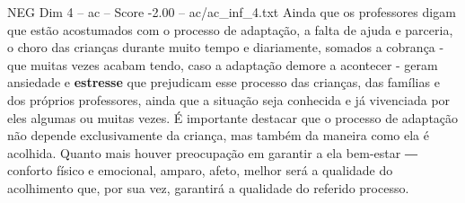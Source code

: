 \begin{textsample}{NEG Dim 4 – ac – Score -2.00 – ac/ac\_inf\_4.txt}
Ainda que os professores digam que estão acostumados com o processo de adaptação, a falta de ajuda e parceria, o choro das crianças durante muito tempo e diariamente, somados a cobrança - que muitas vezes acabam tendo, caso a adaptação demore a acontecer - geram ansiedade e \textbf{estresse} que prejudicam esse processo das crianças, das famílias e dos próprios professores, ainda que a situação seja conhecida e já vivenciada por eles algumas ou muitas vezes.
É importante destacar que o processo de adaptação não depende exclusivamente da criança, mas também da maneira como ela é acolhida.
Quanto mais houver preocupação em garantir a ela bem-estar ― conforto físico e emocional, amparo, afeto, melhor será a qualidade do acolhimento que, por sua vez, garantirá a qualidade do referido processo.

\end{textsample}
